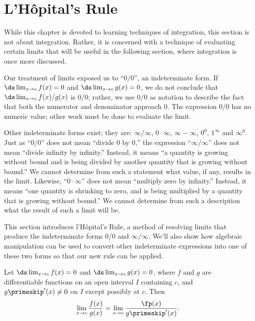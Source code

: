 \section{L'H\^opital's Rule}\label{sec:lhopitals_rule}

While this chapter is devoted to learning techniques of integration, this section is not about integration. Rather, it is concerned with a technique of evaluating certain limits that will be useful in the following section, where integration is once more discussed.

Our treatment of limits exposed us to ``0/0'', an indeterminate form. If $\ds \lim_{x\to c}f(x)=0$ and $\ds \lim_{x\to c} g(x) =0$, we do not conclude that $\ds \lim_{x\to c} f(x)/g(x)$ is $0/0$; rather, we use $0/0$ as notation to describe the fact that both the numerator and denominator approach 0. The expression 0/0 has no numeric value; other work must be done to evaluate the limit.

Other indeterminate forms exist; they are: %
 $\infty/\infty$, $0\cdot\infty$, $\infty-\infty$, $0^0$, $1^\infty$ and $\infty^0$. %
 Just as ``0/0'' does not mean ``divide 0 by 0,'' the expression ``$\infty/\infty$'' does not mean ``divide infinity by infinity.'' Instead, it means ``a quantity is growing without bound and is being divided by another quantity that is growing without bound.'' We cannot determine from such a statement what value, if any, results in the limit. Likewise, ``$0\cdot \infty$'' does not mean ``multiply zero by infinity.'' Instead, it means ``one quantity is shrinking to zero, and is being multiplied by a quantity that is growing without bound.'' We cannot determine from such a description what the result of such a limit will be.

This section introduces l'H\^opital's Rule, a method of resolving limits that produce the indeterminate forms 0/0 and $\infty/\infty$. We'll also show how algebraic manipulation can be used to convert other indeterminate expressions into one of these two forms so that our new rule can be applied.

{Let $\ds \lim_{x\to c}f(x) = 0$ and $\ds \lim_{x\to c}g(x)=0$, where $f$ and $g$ are differentiable functions on an open interval $I$ containing $c$, and $g\primeskip'(x)\neq 0$ on $I$ except possibly at $c$. Then 
$$ \lim_{x\to c} \frac{f(x)}{g(x)} = \lim_{x\to c} \frac{\fp(x)}{g\primeskip'(x)}.$$
}


